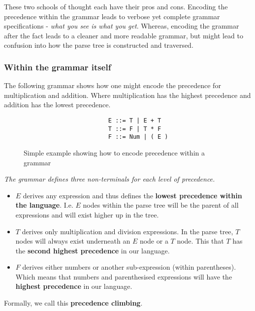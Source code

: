 These two schools of thought each have their pros and cons. Encoding the precedence within the grammar leads to verbose yet complete grammar specifications - \textit{what you see is what you get}. Whereas, encoding the grammar after the fact leads to a cleaner and more readable grammar, but might lead to confusion into how the parse tree is constructed and traversed.

\subsubsection{Within the grammar itself}

The following grammar shows how one might encode the precedence for multiplication and addition. Where multiplication has the highest precedence and addition has the lowest precedence.

\begin{figure}[H]
    \begin{center}
        \begin{verbatim}            
                        E ::= T | E + T
                        T ::= F | T * F
                        F ::= Num | ( E )
        \end{verbatim}
    \end{center}
    \vspace{-1.5em}
    \caption{\label{fig:4.5}Simple example showing how to encode precedence within a grammar}
\end{figure}

\begin{center}
    \textit{The grammar defines three non-terminals for each level of precedence.}
    \begin{itemize}
        \item $E$ derives any expression and thus defines the \textbf{lowest precedence within the language}. I.e. $E$ nodes within the parse tree will be the parent of all expressions and will exist higher up in the tree.
        \item $T$ derives only multiplication and division expressions. In the parse tree, $T$ nodes will always exist underneath an $E$ node or a $T$ node. This that $T$ has the \textbf{second highest precedence} in our language.
        \item $F$ derives either numbers or another sub-expression (within parentheses). Which means that numbers and parenthesised expressions will have the \textbf{highest precedence} in our language.
    \end{itemize}
    \vspace{1em}
    Formally, we call this \textbf{precedence climbing}.\textsuperscript{\cite{abrahamson_2021}\cite{norvell_1999}}
\end{center}

